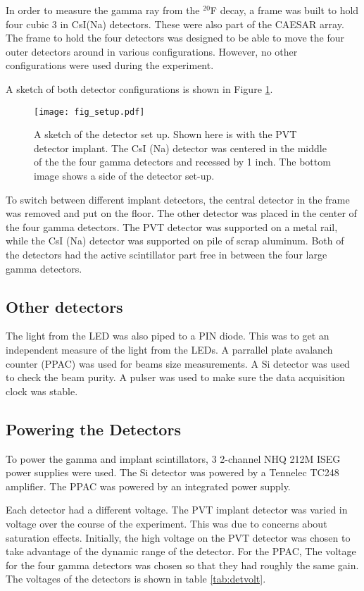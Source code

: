 In order to measure the gamma ray from the $^{20}$F decay, a frame was built to hold four cubic 3 in CsI(Na) detectors.  
These were also part of the CAESAR array.
The frame to hold the four detectors was designed to be able to move the four outer detectors around in various configurations.
However, no other configurations were used during the experiment. 

A sketch of both detector configurations is shown in Figure \ref{fig:detsketch}.

\begin{figure}
	\texttt{[image: fig\_setup.pdf]}
	\caption{A sketch of the detector set up. 
	Shown here is with the PVT detector implant.
	The CsI (Na) detector was centered in the middle of the the four gamma detectors and recessed by 1 inch.
	The bottom image shows a side of the detector set-up.}
	\label{fig:detsketch}
\end{figure}

To switch between different implant detectors, the central detector in the frame was removed and put on the floor.
The other detector was placed in the center of the four gamma detectors.
The PVT detector was supported on a metal rail, while the CsI (Na) detector was supported on pile of scrap aluminum.
Both of the detectors had the active scintillator part free in between the four large gamma detectors. 

\subsection{Other detectors}

The light from the LED was also piped to a PIN diode.
This was to get an independent measure of the light from the LEDs.
A parrallel plate avalanch counter (PPAC) was used for beams size measurements.
A Si detector was used to check the beam purity.
A pulser was used to make sure the data acquisition clock was stable.

\subsection{Powering the Detectors}

To power the gamma and implant scintillators, 3 2-channel NHQ 212M ISEG power supplies were used.
The Si detector was powered by a Tennelec TC248 amplifier.
The PPAC was powered by an integrated power supply.

Each detector had a different voltage. 
The PVT implant detector was varied in voltage over the course of the experiment.
This was due to concerns about saturation effects.
Initially, the high voltage on the PVT detector was chosen to take advantage of the dynamic range of the detector.
For the PPAC, 
The voltage for the four gamma detectors was chosen so that they had roughly the same gain.
The voltages of the detectors is shown in table \ref{tab:detvolt}.

